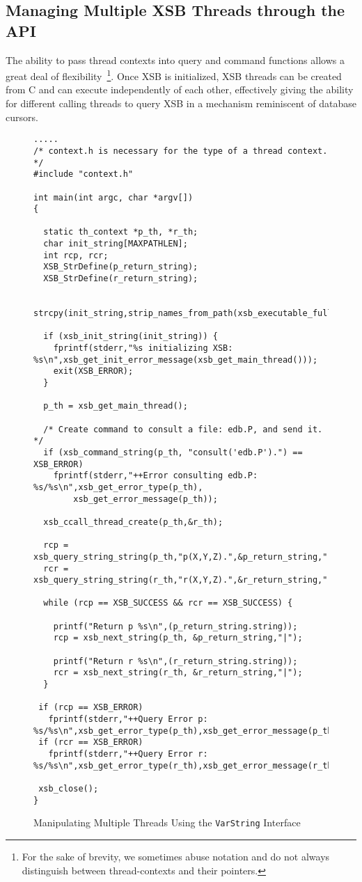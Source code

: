 \subsection{Managing Multiple XSB Threads through the API} \label{sec:CXSBMT}

The ability to pass thread contexts into query and command functions
allows a great deal of flexibility~\footnote{For the sake of brevity,
  we sometimes abuse notation and do not always distinguish between
  thread-contexts and their pointers.}.  Once XSB is initialized, XSB
threads can be created from C and can execute independently of each
other, effectively giving the ability for different calling threads to
query XSB in a mechanism reminiscent of database cursors.

\begin{figure}[hbtp]
\begin{small}
\begin{verbatim}
.....
/* context.h is necessary for the type of a thread context. */
#include "context.h"

int main(int argc, char *argv[])
{ 

  static th_context *p_th, *r_th;
  char init_string[MAXPATHLEN];
  int rcp, rcr;
  XSB_StrDefine(p_return_string);
  XSB_StrDefine(r_return_string);

  strcpy(init_string,strip_names_from_path(xsb_executable_full_path(argv[0]),3));

  if (xsb_init_string(init_string)) {
    fprintf(stderr,"%s initializing XSB: %s\n",xsb_get_init_error_message(xsb_get_main_thread()));
    exit(XSB_ERROR);
  }

  p_th = xsb_get_main_thread();

  /* Create command to consult a file: edb.P, and send it. */
  if (xsb_command_string(p_th, "consult('edb.P').") == XSB_ERROR)
    fprintf(stderr,"++Error consulting edb.P: %s/%s\n",xsb_get_error_type(p_th),
	    xsb_get_error_message(p_th));

  xsb_ccall_thread_create(p_th,&r_th);

  rcp = xsb_query_string_string(p_th,"p(X,Y,Z).",&p_return_string,"|");
  rcr = xsb_query_string_string(r_th,"r(X,Y,Z).",&r_return_string,"|");

  while (rcp == XSB_SUCCESS && rcr == XSB_SUCCESS) {

    printf("Return p %s\n",(p_return_string.string));
    rcp = xsb_next_string(p_th, &p_return_string,"|");

    printf("Return r %s\n",(r_return_string.string));
    rcr = xsb_next_string(r_th, &r_return_string,"|");
  }

 if (rcp == XSB_ERROR) 
   fprintf(stderr,"++Query Error p: %s/%s\n",xsb_get_error_type(p_th),xsb_get_error_message(p_th));
 if (rcr == XSB_ERROR) 
   fprintf(stderr,"++Query Error r: %s/%s\n",xsb_get_error_type(r_th),xsb_get_error_message(r_th));

 xsb_close();      
}
\end{verbatim}
\end{small}
\caption{Manipulating Multiple Threads Using the {\tt VarString} Interface} 
\label{fig:varstringex2}
\end{figure}

